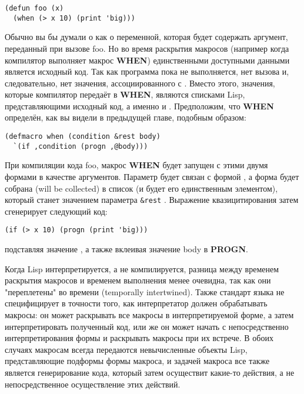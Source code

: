 \begin{lstlisting}
(defun foo (x)
  (when (> x 10) (print 'big)))
\end{lstlisting}

Обычно вы бы думали о  как о переменной, которая будет содержать аргумент,
переданный при вызове foo. Но во время раскрытия макросов (например когда компилятор
выполняет макрос \textbf{WHEN}) единственными доступными данными является исходный
код. Так как программа пока не выполняется, нет вызова  и, следовательно, нет
значения, ассоциированного с . Вместо этого, значения, которые компилятор передаёт
в \textbf{WHEN}, являются списками Lisp, представляющими исходный код, а именно  и . Предположим, что \textbf{WHEN} определён, как вы видели в
предыдущей главе, подобным образом:

\begin{lstlisting}
(defmacro when (condition &rest body)
  `(if ,condition (progn ,@body)))
\end{lstlisting}

При компиляции кода foo, макрос \textbf{WHEN} будет запущен с этими двумя формами в
качестве аргументов. Параметр  будет связан с формой , а
форма  будет собрана (will be collected) в список (и будет его
единственным элементом), который станет значением параметра \lstinline!&rest!
. Выражение квазицитирования затем сгенерирует следующий код:

\begin{lstlisting}
(if (> x 10) (progn (print 'big)))
\end{lstlisting}

подставляя значение , а также вклеивая значение body в \textbf{PROGN}.

Когда Lisp интерпретируется, а не компилируется, разница между временем раскрытия макросов и временем выполнения менее очевидна, так как они "переплетены" во времени (temporally intertwined). Также стандарт языка не специфицирует в точности того, как интерпретатор должен обрабатывать макросы: он может раскрывать все макросы в интерпретируемой форме, а затем интерпретировать полученный код, или же он может начать с непосредственно интерпретирования формы и раскрывать макросы при их встрече. В обоих случаях макросам всегда передаются невычисленные объекты Lisp, представляющие подформы формы макроса, и задачей макроса все также является генерирование кода, который затем осуществит какие-то действия, а не непосредственное осуществление этих действий.


